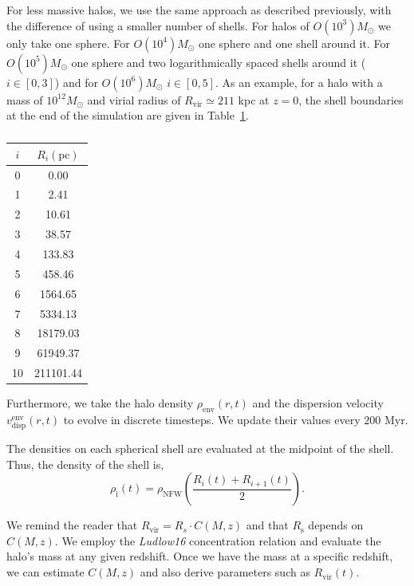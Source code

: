 \documentclass[aps, prd, reprint, nofootinbib]{revtex4-2}
\begin{document}
For less massive halos, we use the same approach as described previously, with the difference of using a smaller number of shells. For halos of $O(10^{3}) M_{\odot}$ we only take one sphere. For $O(10^{4}) M_{\odot}$ one sphere and one shell around it. For $O(10^{5}) M_{\odot}$ one sphere and two logarithmically spaced shells around it ($i \in [0,3]$) and for $O(10^{6}) M_{\odot}$ $i \in [0,5]$. As an example, for a halo with a mass of $10^{12} M_\odot$ and virial radius of $R_{\textrm{vir}}$$\simeq211$ kpc at $z=0$, the shell boundaries at the end of the simulation are given in Table~\ref{Ri_values}.
\begin{table}[ht!]
\centering
\begin{tabular}{|c|c|}
\hline
$ i $ & $ R_i (\textrm{pc}) $ \\
\hline
0 & 0.00 \\
1 & 2.41 \\
2 & 10.61 \\
3 & 38.57 \\
4 & 133.83 \\
5 & 458.46 \\
6 & 1564.65 \\
7 & 5334.13 \\
8 & 18179.03 \\
9 & 61949.37 \\
10 & 211101.44 \\
\hline
\end{tabular}
\caption{}
\label{Ri_values}
\end{table}

Furthermore, we take the halo density $\rho_{\textrm{env}}(r,t)$ and the dispersion velocity $v_{\textrm{disp}}^{\textrm{env}}(r,t)$ to evolve in discrete timesteps. We update their values every $200$ Myr. 

The densities on each spherical shell are evaluated at the midpoint of the shell. 
Thus, the density of the shell is,
\begin{equation}
\rho_{\textrm{i}}(t) = \rho_{\textrm{NFW}}\left(\frac{R_{i}(t) + R_{i+1}(t)}{2}\right).
\end{equation}

We remind the reader that $R_{\textrm{vir}}=R_{s} \cdot C(M,z)$ and that $R_{\textrm{s}}$ depends on $C(M,z)$. 
We employ the \textit{Ludlow16} concentration relation and evaluate the halo's mass at any given redshift. 
Once we have the mass at a specific redshift, we can estimate $C(M,z)$ and also derive parameters such as $R_{\textrm{vir}}(t)$.
\end{document}
